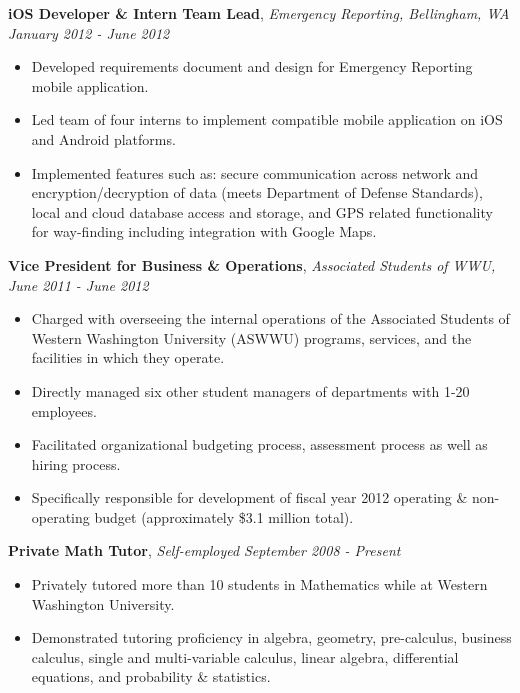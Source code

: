 \documentclass[9pt]{article}
\newenvironment{changemargin}[2]{%
  \begin{list}{}{%
    \setlength{\topsep}{0pt}%
    \setlength{\leftmargin}{#1}%
    \setlength{\rightmargin}{#2}%
    \setlength{\listparindent}{\parindent}%
    \setlength{\itemindent}{\parindent}%
    \setlength{\parsep}{\parskip}%
  }%
  \item[]}{\end{list}
}
\newenvironment{body} {
	\vspace*{-16pt}
	\begin{changemargin}{-0.20in}{-0.5in}
  }	
	{\end{changemargin}
}
\begin{document}
\begin{body}
	\textbf{iOS Developer \& Intern Team Lead}, \emph{Emergency Reporting, Bellingham, WA} \hfill \emph{January 2012 - June 2012}\\
	\vspace*{-4pt}
	\begin{itemize} \itemsep -0pt  %
		\item Developed requirements document and design for Emergency Reporting mobile application. 
		\item Led team of four interns to implement compatible mobile application on iOS and Android platforms. 
		\item Implemented features such as: secure communication across network and encryption/decryption of data (meets Department of Defense Standards), local and cloud database access and storage, and GPS related functionality for way-finding including integration with Google Maps.  
	\end{itemize}

	\textbf{Vice President for Business \& Operations}, \emph{Associated Students of WWU,} \hfill \emph{June 2011 - June 2012}\\
	\vspace*{-4pt}
	\begin{itemize} \itemsep -0pt  %
		\item Charged with overseeing the internal operations of the Associated Students of Western Washington University (ASWWU) programs, services, and the facilities in which they operate.
		\item Directly managed six other student managers of departments with 1-20 employees. 
		\item Facilitated organizational budgeting process, assessment process as well as hiring process. 
		\item Specifically responsible for development of fiscal year 2012 operating \& non-operating budget (approximately \$3.1 million total). 
	\end{itemize}

	\textbf {Private Math Tutor}, \emph{Self-employed} \hfill \emph{September 2008 - Present}\\
	\vspace*{-4pt}
	\begin{itemize} \itemsep -0pt  %
		\item Privately tutored more than 10 students in Mathematics while at Western Washington University.
		\item Demonstrated tutoring proficiency in algebra, geometry, pre-calculus, business calculus, single and multi-variable calculus, linear algebra, differential equations, and probability \& statistics. 
	\end{itemize}
	

\end{body}
\end{document}
